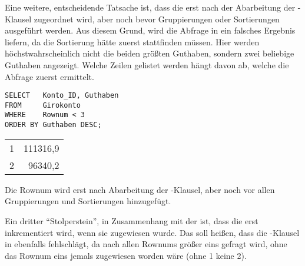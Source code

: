           Eine weitere, entscheidende Tatsache ist, dass die  erst nach der Abarbeitung der \WHERE-Klausel zugeordnet wird, aber noch bevor Gruppierungen oder Sortierungen ausgeführt werden. Aus diesem Grund, wird die Abfrage in  ein falsches Ergebnis liefern, da die Sortierung hätte zuerst stattfinden müssen. Hier werden höchstwahrscheinlich nicht die beiden größten Guthaben, sondern zwei beliebige Guthaben angezeigt. Welche Zeilen gelistet werden hängt davon ab, welche die Abfrage zuerst ermittelt.
          \begin{lstlisting}[language=oracle_sql,caption={Falsche Anwendung der Rownum-Pseudospalte},label=sql06_12]
SELECT   Konto_ID, Guthaben
FROM     Girokonto
WHERE    Rownum < 3
ORDER BY Guthaben DESC;
          \end{lstlisting}
          \begin{center}
            \begin{small}
              \tablehead{}

              \begin{oraclesql}
                \begin{supertabular}{rr}
                  1 & 111316,9 \\
                  2 & 96340,2 \\
                \end{supertabular}
              \end{oraclesql}
            \end{small}
          \end{center}
          \begin{merke}
            Die Rownum wird erst nach Abarbeitung der \WHERE-Klausel, aber noch vor allen Gruppierungen und Sortierungen hinzugefügt.
          \end{merke}
          Ein dritter \enquote{Stolperstein}, in Zusammenhang mit der  ist, dass die  erst inkrementiert wird, wenn sie zugewiesen wurde. Das soll heißen, dass die \WHERE-Klausel in  ebenfalls fehlschlägt, da nach allen Rownums größer eins gefragt wird, ohne das Rownum eins jemals zugewiesen worden wäre (ohne 1 keine 2).
